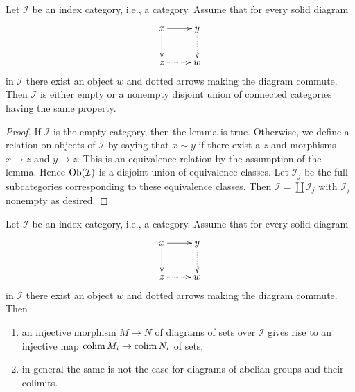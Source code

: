 \begin{lemma}
\label{lemma-split-into-connected}
Let $\mathcal{I}$ be an index category, i.e., a category. Assume
that for every solid diagram
$$
\xymatrix{
x \ar[d] \ar[r] & y \ar@{..>}[d] \\
z \ar@{..>}[r] & w
}
$$
in $\mathcal{I}$ there exist an object $w$ and dotted arrows
making the diagram commute. Then $\mathcal{I}$ is either empty
or a nonempty disjoint union of connected categories having
the same property.
\end{lemma}

\begin{proof}
If $\mathcal{I}$ is the empty category, then the lemma is true.
Otherwise, we define a relation on objects of $\mathcal{I}$ by
saying that $x \sim y$ if there exist a $z$ and
morphisms $x \to z$ and $y \to z$. This is an equivalence
relation by the assumption of the lemma. Hence $\mathop{\mathrm{Ob}}\nolimits(\mathcal{I})$
is a disjoint union of equivalence classes. Let $\mathcal{I}_j$
be the full subcategories corresponding to these equivalence classes.
Then $\mathcal{I} = \coprod \mathcal{I}_j$ with $\mathcal{I}_j$
nonempty as desired.
\end{proof}

\begin{lemma}
\label{lemma-preserve-injective-maps}
Let $\mathcal{I}$ be an index category, i.e., a category. Assume
that for every solid diagram
$$
\xymatrix{
x \ar[d] \ar[r] & y \ar@{..>}[d] \\
z \ar@{..>}[r] & w
}
$$
in $\mathcal{I}$ there exist an object $w$ and dotted arrows
making the diagram commute. Then
\begin{enumerate}
\item an injective morphism $M \to N$ of diagrams of sets over
$\mathcal{I}$ gives rise to an injective map $\mathop{\mathrm{colim}}\nolimits M_i \to \mathop{\mathrm{colim}}\nolimits N_i$
of sets,
\item in general the same is not the case for diagrams of abelian
groups and their colimits.
\end{enumerate}
\end{lemma}

